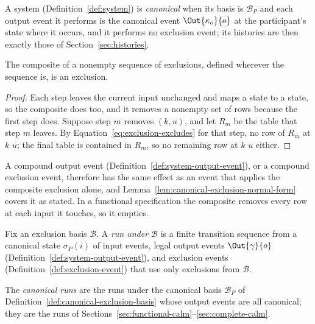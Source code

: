 \begin{definition}
\label{def:canonical-system}
A system (Definition~\ref{def:system}) is \emph{canonical} when its basis is
$\mathcal B_P$ and each output event it performs is the canonical event $\Out{\kappa_o}{o}$ at the
participant's state where it occurs, and it performs no exclusion event; its histories
are then exactly those of Section~\ref{sec:histories}.
\end{definition}

\begin{lemma}
\label{lem:compound-exclusion}
The composite of a nonempty sequence of exclusions, defined wherever the
sequence is, is an exclusion.
\end{lemma}

\begin{proof}
Each step leaves the current input unchanged and maps a state to a state, so the
composite does too, and it removes a nonempty set of rows because the first
step does.  Suppose step $m$ removes $(k,u)$, and let $R_m$ be the table that
step $m$ leaves.  By Equation~\ref{eq:exclusion-excludes} for that step, no
row of $R_m$ at $k$ \outrel $u$; the final table is contained in $R_m$, so no
remaining row at $k$ \outrel $u$ either.
\end{proof}

A compound output event (Definition~\ref{def:system-output-event}), or a
compound exclusion event, therefore has the same effect as an event that applies the composite exclusion alone,
and Lemma~\ref{lem:canonical-exclusion-normal-form} covers it as stated.  In a
functional specification the composite removes every row at each input it
touches, so it empties.

\begin{definition}
\label{def:run-under-basis}
Fix an exclusion basis $\mathcal B$.  A \emph{run under $\mathcal B$} is a
finite transition sequence from a canonical state $\sigma_P(i)$ of input events, legal output events $\Out{\gamma}{o}$
(Definition~\ref{def:system-output-event}), and exclusion events
(Definition~\ref{def:exclusion-event}) that use only exclusions from
$\mathcal B$.
\end{definition}

\begin{definition}
\label{def:canonical-run}
The \emph{canonical runs} are the runs under the canonical basis
$\mathcal B_P$ of Definition~\ref{def:canonical-exclusion-basis} whose output
events are all canonical; they are the runs of
Sections~\ref{sec:functional-calm}--\ref{sec:complete-calm}.
\end{definition}

